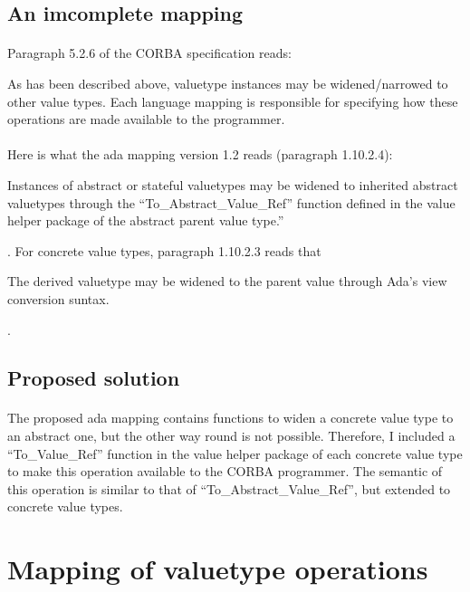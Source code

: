 \subsection{An imcomplete mapping}
\paragraph{}Paragraph 5.2.6 of the CORBA specification reads:
\begin{it}As has been described above, valuetype instances may be
widened/narrowed to other value types. Each language mapping is
responsible for specifying how these operations are made available to
the programmer.\end{it}

\paragraph{}Here is what the ada mapping version 1.2 reads (paragraph 1.10.2.4):
\begin{it}Instances of abstract or stateful valuetypes may be widened
to inherited abstract valuetypes through the
``To\_Abstract\_Value\_Ref'' function defined in the value helper
package of the abstract parent value type.''\end{it}. For concrete
value types, paragraph 1.10.2.3 reads that \begin{it}The derived
valuetype may be widened to the parent value through Ada's view
conversion suntax.\end{it}.

\subsection{Proposed solution}
\paragraph{}The proposed ada mapping contains functions to widen a
concrete value type to an abstract one, but the other way round is not
possible. Therefore, I included a ``To\_Value\_Ref'' function in the
value helper package of each concrete value type to make this
operation available to the CORBA programmer. The semantic of this
operation is similar to that of ``To\_Abstract\_Value\_Ref'', but
extended to concrete value types.

\section{Mapping of valuetype operations}

